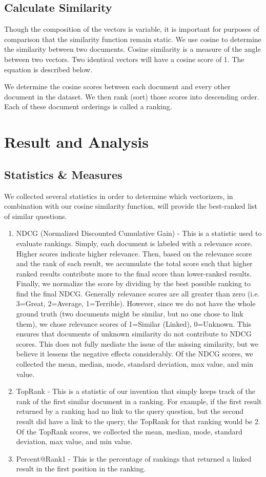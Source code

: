 \documentclass{acm_proc_article-sp}
\begin{document}
\subsection{Calculate Similarity}
Though the composition of the vectors is variable, it is important for purposes of comparison that the similarity function remain static. We use cosine to determine the similarity between two documents. Cosine similarity is a measure of the angle between two vectors. Two identical vectors will have a cosine score of 1. The equation is described below.

We determine the cosine scores between each document and every other document in the dataset. We then rank (sort) those scores into descending order. Each of these document orderings is called a ranking. 

\section{Result and Analysis}
\subsection{Statistics \& Measures}
We collected several statistics in order to determine which vectorizers, in combination with our cosine similarity function, will provide the best-ranked list of similar questions. 
\begin{enumerate}[noitemsep]
	\item NDCG (Normalized Discounted Cumulative Gain) - This is a statistic used to evaluate rankings. Simply, each document is labeled with a relevance score. Higher scores indicate higher relevance. Then, based on the relevance score and the rank of each result, we accumulate the total score such that higher ranked results contribute more to the final score than lower-ranked results. Finally, we normalize the score by dividing by the best possible ranking to find the final NDCG. 
Generally relevance scores are all greater than zero (i.e. 3=Great, 2=Average, 1=Terrible). However, since we do not have the whole ground truth (two documents might be similar, but no one chose to link them), we chose relevance scores of 1=Similar (Linked), 0=Unknown. This ensures that documents of unknown similarity do not contribute to NDCG scores. This does not fully mediate the issue of the missing similarity, but we believe it lessens the negative effects considerably.
Of the NDCG scores, we collected the mean, median, mode, standard deviation, max value, and min value.
	\item TopRank - This is a statistic of our invention that simply keeps track of the rank of the first similar document in a ranking. For example, if the first result returned by a ranking had no link to the query question, but the second result did have a link to the query, the TopRank for that ranking would be 2. Of the TopRank scores, we collected the mean, median, mode, standard deviation, max value, and min value.
	\item Percent@Rank1 - This is the percentage of rankings that returned a linked result in the first position in the ranking.
\end{enumerate}
\end{document}
